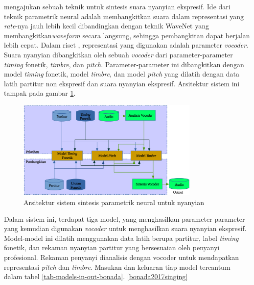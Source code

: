 \citet{bonada2017singing} mengajukan sebuah teknik untuk sintesis suara nyanyian ekspresif. Ide dari teknik parametrik neural \parencite{bonada2017singing} adalah membangkitkan suara dalam representasi yang \textit{rate}-nya jauh lebih kecil dibandingkan dengan teknik WaveNet\parencite{Oord2016WaveNetAG} yang membangkitkan\textit{waveform} secara langsung, sehingga pembangkitan dapat berjalan lebih cepat. Dalam riset \citet{bonada2017singing}, representasi yang digunakan adalah parameter \textit{vocoder}. Suara nyanyian dibangkitkan oleh sebuah \textit{vocoder} dari parameter-parameter \textit{timing} fonetik, \textit{timbre}, dan \textit{pitch}. Parameter-parameter ini dibangkitkan dengan model \textit{timing} fonetik, model \textit{timbre}, dan model \textit{pitch} yang dilatih dengan data latih partitur non ekspresif dan suara nyanyian ekspresif. Arsitektur sistem ini tampak pada gambar \ref{fig-system-overview-bonada}.

\begin{figure}[h]
    \centering
    \includegraphics[width=0.8\textwidth]{resources/system-overview-bonada.eps}
    \caption{Arsitektur sistem sintesis parametrik neural untuk nyanyian \parencite{bonada2017singing}}\label{fig-system-overview-bonada}
\end{figure}

Dalam sistem ini, terdapat tiga model, yang menghasilkan parameter-parameter yang kemudian digunakan \textit{vocoder} untuk menghasilkan suara nyanyian ekspresif. Model-model ini dilatih menggunakan data latih berupa partitur, label \textit{timing} fonetik, dan rekaman nyanyian partitur yang bersesuaian oleh penyanyi profesional. Rekaman penyanyi dianalisis dengan vocoder untuk mendapatkan representasi \textit{pitch} dan \textit{timbre}. Masukan dan keluaran tiap model tercantum dalam tabel \ref{tab-models-in-out-bonada}. \ref{bonada2017singing}

